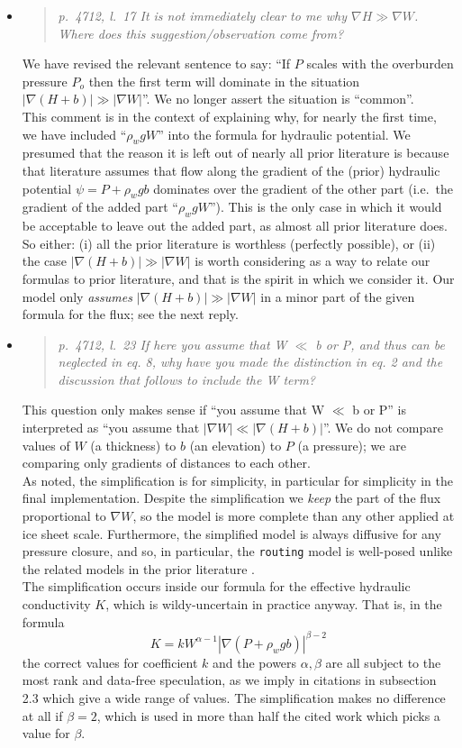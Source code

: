 \documentclass[11pt,reqno]{amsart}
\newcommand{\grad}{\nabla}
\newcommand{\reply}[2]{
\medskip\medskip
\item  \begin{quote}
\emph{#1}
\end{quote}

\medskip
\noindent #2}
\begin{document}
\begin{itemize}
\reply{p.~4712, l.~17 It is not immediately clear to me why $\nabla H \gg \nabla W$. Where does this suggestion/observation come from?}
{We have revised the relevant sentence to say: ``If $P$ scales with the overburden pressure $P_o$ then the first term will dominate in the situation $|\nabla (H+b)| \gg |\nabla W|$''.  We no longer assert the situation is ``common''.\\
\indent This comment is in the context of explaining why, for nearly the first time, we have included ``$\rho_w g W$'' into the formula for hydraulic potential.  We presumed that the reason it is left out of nearly all prior literature is because that literature assumes that flow along the gradient of the (prior) hydraulic potential $\psi = P + \rho_w g b$ dominates over the gradient of the other part (i.e.~the gradient of the added part ``$\rho_w g W$'').  This is the only case in which it would be acceptable to leave out the added part, as almost all prior literature does. \\
\indent So either: (i) all the prior literature is worthless (perfectly possible), or (ii) the case $|\nabla (H+b)| \gg |\nabla W|$ is worth considering as a way to relate our formulas to prior literature, and that is the spirit in which we consider it.  Our model only \emph{assumes} $|\nabla (H+b)| \gg |\nabla W|$ in a minor part of the given formula for the flux; see the next reply.}

\reply{p.~4712, l.~23 If here you assume that W $\ll$ b or P, and thus can be neglected in eq. 8, why have you made the distinction in eq. 2 and the discussion that follows to include the W term?}
{This question only makes sense if ``you assume that W $\ll$ b or P'' is interpreted as ``you assume that $|\nabla W| \ll |\nabla (H+b)|$''.  We do not compare values of $W$ (a thickness) to $b$ (an elevation) to $P$ (a pressure); we are comparing only gradients of distances to each other.\\
\indent As noted, the simplification is for simplicity, in particular for simplicity in the final implementation.  Despite the simplification we \emph{keep} the part of the flux proportional to $\grad W$, so the model is more complete than any other applied at ice sheet scale.  Furthermore, the simplified model is always diffusive for any pressure closure, and so, in particular, the \texttt{routing} model is well-posed unlike the related models in the prior literature \cite{LeBrocqetal2009,Siegertetal2009}. \\
\indent The simplification occurs inside our formula for the effective hydraulic conductivity $K$, which is wildy-uncertain in practice anyway.  That is, in the formula
  $$K = k W^{\alpha-1} |\grad(P+\rho_w g b)|^{\beta-2}$$
the correct values for coefficient $k$ and the powers $\alpha,\beta$ are all subject to the most rank and data-free speculation, as we imply in citations in subsection 2.3 which give a wide range of values.  The simplification makes no difference at all if $\beta=2$, which is used in more than half the cited work which picks a value for $\beta$.}


\end{itemize}
\end{document}
